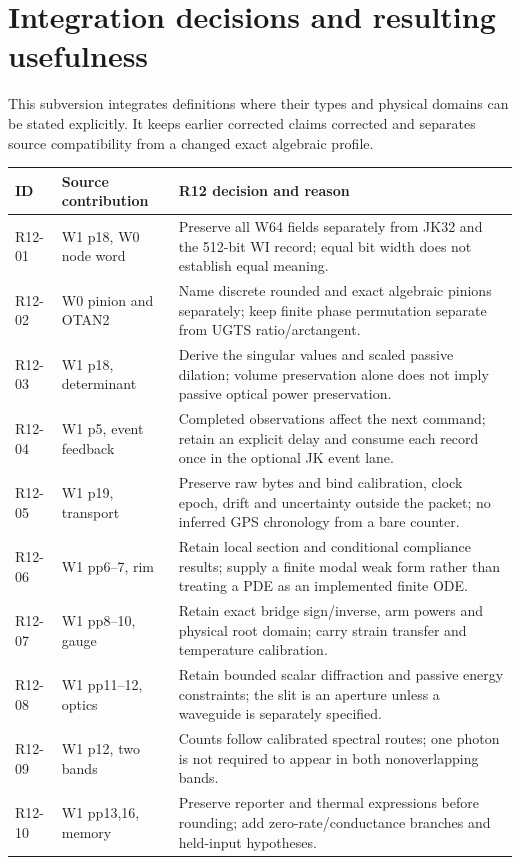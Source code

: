\section{Integration decisions and resulting usefulness}
\label{sec:want-completion}
This subversion integrates definitions where their types and physical domains
can be stated explicitly. It keeps earlier corrected claims corrected and
separates source compatibility from a changed exact algebraic profile.

\small
\begin{longtable}{@{}P{13mm}P{43mm}P{94mm}@{}}
\toprule ID & Source contribution & R12 decision and reason\\\midrule\endhead
R12-01 & W1 p18, W0 node word & Preserve all W64 fields separately from JK32 and the 512-bit WI record; equal bit width does not establish equal meaning.\\
R12-02 & W0 pinion and OTAN2 & Name discrete rounded and exact algebraic pinions separately; keep finite phase permutation separate from UGTS ratio/arctangent.\\
R12-03 & W1 p18, determinant & Derive the singular values and scaled passive dilation; volume preservation alone does not imply passive optical power preservation.\\
R12-04 & W1 p5, event feedback & Completed observations affect the next command; retain an explicit delay and consume each record once in the optional JK event lane.\\
R12-05 & W1 p19, transport & Preserve raw bytes and bind calibration, clock epoch, drift and uncertainty outside the packet; no inferred GPS chronology from a bare counter.\\
R12-06 & W1 pp6--7, rim & Retain local section and conditional compliance results; supply a finite modal weak form rather than treating a PDE as an implemented finite ODE.\\
R12-07 & W1 pp8--10, gauge & Retain exact bridge sign/inverse, arm powers and physical root domain; carry strain transfer and temperature calibration.\\
R12-08 & W1 pp11--12, optics & Retain bounded scalar diffraction and passive energy constraints; the slit is an aperture unless a waveguide is separately specified.\\
R12-09 & W1 p12, two bands & Counts follow calibrated spectral routes; one photon is not required to appear in both nonoverlapping bands.\\
R12-10 & W1 pp13,16, memory & Preserve reporter and thermal expressions before rounding; add zero-rate/conductance branches and held-input hypotheses.\\

\end{longtable}
